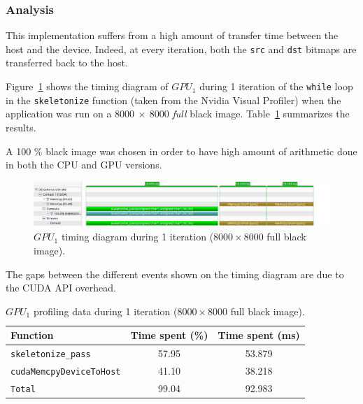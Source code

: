 \documentclass[11pt,a4paper]{article}
\begin{document}
            \subsubsection{Analysis}
                This implementation suffers from a high amount of transfer time between the host and the device.
                Indeed, at every iteration, both the \verb+src+ and \verb+dst+ bitmaps are transferred back to the host.

                Figure~\ref{fig:black_gpu1_timing_diagram} shows the timing diagram of $GPU_{1}$ during 1 iteration of the \verb+while+ loop in the \verb+skeletonize+ function (taken from the Nvidia Visual Profiler) when the application was run on a $8000~\times~8000$ \emph{full} black image.
                Table~\ref{tab:black_gpu1_timing_diagram} summarizes the results.

                A 100 \% black image was chosen in order to have high amount of arithmetic done in both the CPU and GPU versions.

                \begin{figure}[ht]
                    \centering
                    \includegraphics[width=\textwidth]{figs/black_gpu1_timing_diagram.png}
                    \caption{$GPU_{1}$ timing diagram during 1 iteration ($8000 \times 8000$ full black image).}
                    \label{fig:black_gpu1_timing_diagram}
                \end{figure}

                The gaps between the different events shown on the timing diagram are due to the CUDA API overhead.

                \begin{table}[ht]
                    \centering
                    \begin{tabular}{lcc}
                        \toprule
                        Function                      & Time spent (\%) & Time spent (ms) \\
                        \midrule
                        \verb+skeletonize_pass+       & 57.95           & 53.879          \\
                        \verb+cudaMemcpyDeviceToHost+ & 41.10           & 38.218          \\
                        \midrule
                        \verb+Total+                  & 99.04           & 92.983          \\
                        \bottomrule
                    \end{tabular}
                    \caption{$GPU_{1}$ profiling data during 1 iteration ($8000 \times 8000$ full black image).}
                    \label{tab:black_gpu1_timing_diagram}
                \end{table}
\end{document}
